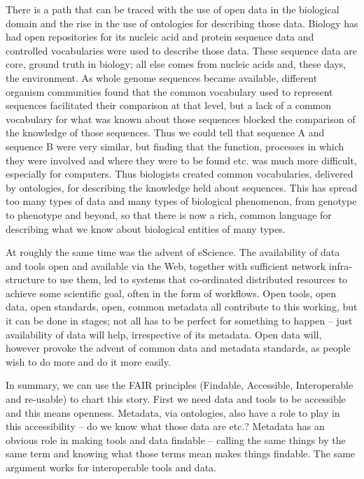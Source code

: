 \documentclass[a4paper,USenglish]{dagrep}
\begin{document}
There is a path that can be traced with the use of open data in the biological
domain and the rise in the use of ontologies for describing those data. Biology
has had open repositories for its nucleic acid and protein sequence data and
controlled vocabularies were used to describe those data. These sequence data
are core, ground truth in biology; all else comes from nucleic acids and, these
days, the environment. As whole genome sequences became available, different
organism communities found that the common vocabulary used to represent
sequences facilitated their comparison at that level, but a lack of a common
vocabulary for what was known about those sequences blocked the comparison of
the knowledge of those sequences. Thus we could tell that sequence A and
sequence B were very similar, but finding that the function, processes in which
they were involved and where they were to be found etc. was much more difficult,
especially for computers. Thus biologists created common vocabularies, delivered
by ontologies, for describing the knowledge held about sequences. This has
spread too many types of data and many types of biological phenomenon, from
genotype to phenotype and beyond, so that there is now a rich, common language
for describing what we know about biological entities of many types.

At roughly the same time was the advent of eScience. The availability of data
and tools open and available via the Web, together with sufficient network
infra-structure to use them, led to systems that co-ordinated distributed
resources to achieve some scientific goal, often in the form of workflows.  Open
tools, open data, open standards, open, common metadata all contribute to this
working, but it can be done in  stages; not all has to be perfect for something
to happen – just availability of data will help, irrespective of its metadata.
Open data will, however provoke the advent of common data and metadata
standards, as people wish to do more and do it more easily.

In summary, we can use the FAIR principles (Findable, Accessible, Interoperable
and re-usable) to chart this story. First we need data and tools to be
accessible and this means openness. Metadata, via ontologies, also have a   role
to play in this accessibility – do we know what those data are etc.? Metadata
has an obvious role in making tools and data findable – calling the same things
by the same term and knowing what those terms mean makes things findable. The
same argument works for interoperable tools and data.
\end{document}
